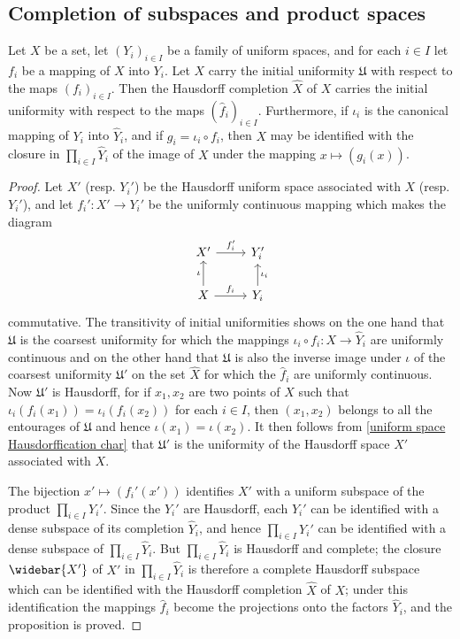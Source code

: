 \subsection{Completion of subspaces and product spaces}
\begin{proposition}\label{uniform space completion of initial topology}
Let $X$ be a set, let $(Y_i)_{i\in I}$ be a family of uniform spaces, and for each $i\in I$ let $f_i$ be a mapping of $X$ into $Y_i$. Let $X$ carry the initial uniformity $\mathfrak{U}$ with respect to the maps $(f_i)_{i\in I}$. Then the Hausdorff completion $\widehat{X}$ of $X$ carries the initial uniformity with respect to the maps $(\hat{f}_i)_{i\in I}$. Furthermore, if $\iota_i$ is the canonical mapping of $Y_i$ into $\widehat{Y}_i$, and if $g_i=\iota_i\circ f_i$, then $X$ may be identified with the closure in $\prod_{i\in I}\widehat{Y}_i$ of the image of $X$ under the mapping $x\mapsto(g_i(x))$.
\end{proposition}
\begin{proof}
Let $X'$ (resp. $Y_i'$) be the Hausdorff uniform space associated with $X$ (resp. $Y_i'$), and let $f_i':X'\to Y_i'$ be the uniformly continuous mapping which makes the diagram
\[\begin{tikzcd}
X'\ar[r,"f_i'"]&Y_i'\\
X\ar[u,"\iota"]\ar[r,"f_i"]&Y_i\ar[u,swap,"\iota_i"]
\end{tikzcd}\]
commutative. The transitivity of initial uniformities shows on the one hand that $\mathfrak{U}$ is the coarsest uniformity for which the mappings $\iota_i\circ f_i:X\to\widehat{Y}_i$ are uniformly continuous and on the other hand that $\mathfrak{U}$ is also the inverse image under $\iota$ of the coarsest uniformity $\mathfrak{U}'$ on the set $\widehat{X}$ for which the $\hat{f}_i$ are uniformly continuous. Now $\mathfrak{U}'$ is Hausdorff, for if $x_1,x_2$ are two points of $X$ such that $\iota_i(f_i(x_1))=\iota_i(f_i(x_2))$ for each $i\in I$, then $(x_1,x_2)$ belongs to all the entourages of $\mathfrak{U}$ and hence $\iota(x_1)=\iota(x_2)$. It then follows from \cref{uniform space Hausdorffication char} that $\mathfrak{U}'$ is the uniformity of the Hausdorff space $X'$ associated with $X$.\par
The bijection $x'\mapsto(f_i'(x'))$ identifies $X'$ with a uniform subspace of the product $\prod_{i\in I}Y_i'$. Since the $Y_i'$ are Hausdorff, each $Y_i'$ can be identified with a dense subspace of its completion $\widehat{Y}_i$, and hence $\prod_{i\in I}Y_i'$ can be identified with a dense subspace of $\prod_{i\in I}\widehat{Y}_i$. But $\prod_{i\in I}\widehat{Y}_i$ is Hausdorff and complete; the closure $\widebar{X'}$ of $X'$ in $\prod_{i\in I}\widehat{Y}_i$ is therefore a complete Hausdorff subspace which can be identified with the Hausdorff completion $\widehat{X}$ of $X$; under this identification the mappings $\hat{f}_i$ become the projections onto the factors $\widehat{Y}_i$, and the proposition is proved.
\end{proof}
